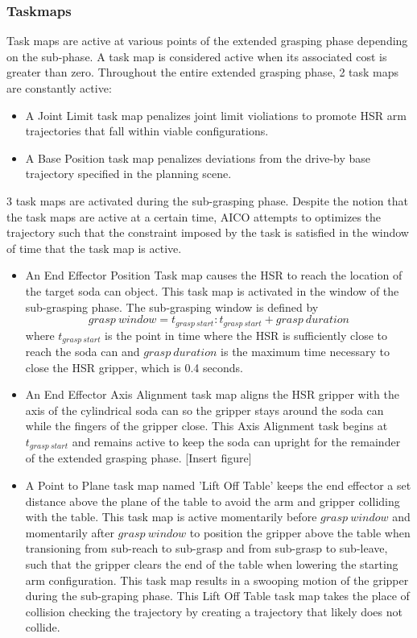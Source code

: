 \documentclass[12pt]{article}
\begin{document}
            \subsubsection{Taskmaps}
                Task maps are active at various points of the extended grasping phase depending on the sub-phase. A task map is considered active when its associated cost is greater than zero. Throughout the entire extended grasping phase, 2 task maps are constantly active:
                \begin{itemize}
                    \item A Joint Limit task map penalizes joint limit violiations to promote HSR arm trajectories that fall within viable configurations.

                    \item A Base Position task map penalizes deviations from the drive-by base trajectory specified in the planning scene.
                \end{itemize}
                3 task maps are activated during the sub-grasping phase. Despite the notion that the task maps are active at a certain time, AICO attempts to optimizes the trajectory such that the constraint imposed by the task is satisfied in the window of time that the task map is active.
                \begin{itemize}
                    \item An End Effector Position Task map causes the HSR to reach the location of the target soda can object. This task map is activated in the window of the sub-grasping phase. The sub-grasping window is defined by 
                    \[{grasp\ window} = t_{grasp\ start}: t_{grasp\ start}+grasp\  duration\] 
                    where \(t_{grasp\ start}\) is the point in time where the HSR is sufficiently close to reach the soda can and \({grasp\ duration}\) is the maximum time necessary to close the HSR gripper, which is 0.4 seconds.

                    \item An End Effector Axis Alignment task map aligns the HSR gripper with the axis of the cylindrical soda can so the gripper stays around the soda can while the fingers of the gripper close. This Axis Alignment task begins at \(t_{grasp\ start}\) and remains active to keep the soda can upright for the remainder of the extended grasping phase.
                    [Insert figure]

                    \item A Point to Plane task map named 'Lift Off Table' keeps the end effector a set distance above the plane of the table to avoid the arm and gripper colliding with the table. This task map is active momentarily before \({grasp\ window}\) and momentarily after \({grasp\ window}\) to position the gripper above the table when transioning from sub-reach to sub-grasp and from sub-grasp to sub-leave, such that the gripper clears the end of the table when lowering the starting arm configuration. This task map results in a swooping motion of the gripper during the sub-graping phase. This Lift Off Table task map takes the place of collision checking the trajectory by creating a trajectory that likely does not collide.
                \end{itemize}
\end{document}
